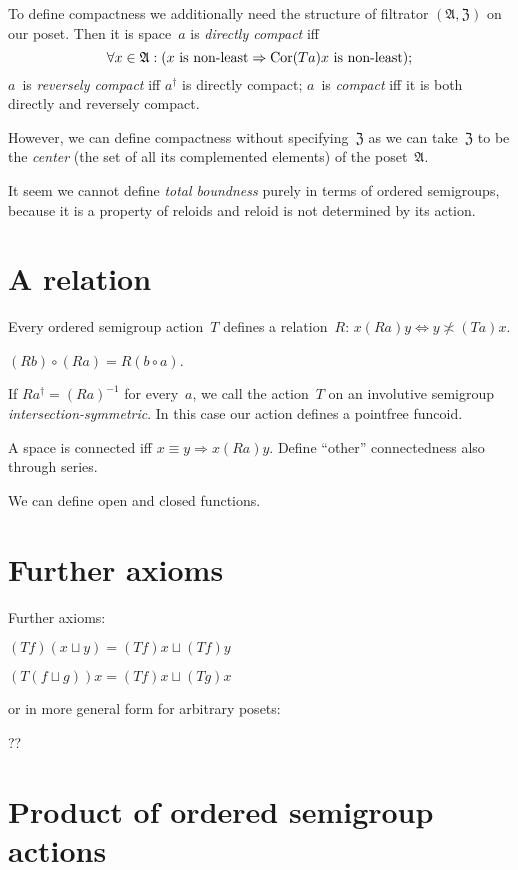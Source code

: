 To define compactness we additionally need the structure of filtrator $(\mathfrak{A},\mathfrak{Z})$ on our poset. Then it is space~$a$ is \emph{directly compact} iff
\[\forall x\in\mathfrak{A}:(x\text{ is non-least}\Rightarrow\operatorname{Cor}(Ta)x\text{ is non-least}); \]
$a$~is \emph{reversely compact} iff $a^{\dagger}$ is directly compact; $a$~is \emph{compact} iff it is both directly and reversely compact.

However, we can define compactness without specifying~$\mathfrak{Z}$ as we can take~$\mathfrak{Z}$ to be the \emph{center} (the set of all its complemented elements) of the poset~$\mathfrak{A}$.

It seem we cannot define \emph{total boundness} purely in terms of ordered semigroups, because it is a property of reloids and reloid is not determined by its action.

\section{A relation}

Every ordered semigroup action~$T$ defines a relation~$R$: $x(Ra)y\Leftrightarrow y\nasymp(Ta)x$.

\begin{thm}
$(Rb)\circ(Ra) = R(b\circ a)$. 
\end{thm}

If $Ra^{\dagger}=(Ra)^{-1}$ for every~$a$, we call the action~$T$ on an involutive semigroup \emph{inter\-sec\-tion-sym\-met\-ric}. In this case our action defines a pointfree funcoid.

A space is connected iff $x\equiv y\Rightarrow x(Ra)y$. Define ``other'' connectedness also through series.

We can define open and closed functions.

\section{Further axioms}

Further axioms:

$(Tf)(x\sqcup y)=(Tf)x\sqcup(Tf)y$

$(T(f\sqcup g))x=(Tf)x\sqcup(Tg)x$

or in more general form for arbitrary posets:

??

\section{Product of ordered semigroup actions}


